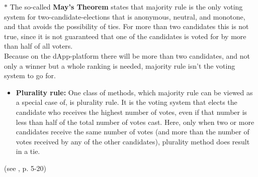 \noindent $\bm{\ast}$ The so-called \textbf{May's Theorem} states that majority rule %
is the only voting system for two-candidate-elections that is anonymous, neutral, and monotone, and that avoids the possibility of ties. For more than two candidates this is not true, since it is not guaranteed that one of the candidates is voted for by more than half of all voters. \\
Because on the dApp-platform there will be more than two candidates, and not only a winner but a whole ranking is needed, majority rule isn't the voting system to go for.

\begin{itemize}[leftmargin = 0pt, nosep]
\item {\textbf{Plurality rule:}} One class of methods, which majority rule can be viewed as a special case of, is plurality rule. It is the voting system that elects the candidate who receives the highest number of votes, even if that number is less than half of the total number of votes cast. Here, only when two or more candidates receive the same number of votes (and more than the number of votes received by any of the other candidates), plurality method does result in a tie.
\end{itemize}
(see \cite{voting}, p. 5-20)\\ \\

